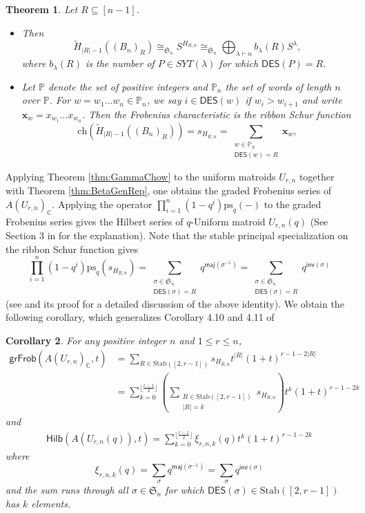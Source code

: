 \documentclass[reqno]{amsart}
\newcommand{\DES}{{\mathsf{DES}}}
\newcommand{\inv}{{\mathsf{inv}}}
\newcommand{\maj}{{\mathsf{maj}}}
\newcommand{\ch}{{\mathrm{ch}}}
\newcommand{\ps}{{\mathrm{ps}_q}}
\newcommand{\Stab}{{\mathrm{Stab}}}
\renewcommand{\S}{{\mathfrak{S}}}
\newcommand{\x}{{\mathbf{x}}}
\newcommand{\Hilb}{{\mathsf{Hilb}}}
\newcommand{\grFrob}{{\mathsf{grFrob}}}
\newtheorem{thm}{Theorem}[section]
\newtheorem{cor}[thm]{Corollary}
\theoremstyle{definition}
\theoremstyle{remark}
\begin{document}
\begin{thm} \label{thm:RankHomologyBn}
Let $R\subseteq [n-1]$. 
\begin{itemize}
    \item[(i)] Then
\[
    \tilde{H}_{|R|-1}({(B_n)}_R)\cong_{\S_n} S^{H_{R,n}}\cong_{\S_n}\bigoplus_{\lambda\vdash n}b_{\lambda}(R)S^{\lambda},
\]    
where $b_{\lambda}(R)$ is the number of $P\in SYT(\lambda)$ for which $\DES(P)=R$.
    \item[(ii)] Let $\mathbb{P}$ denote the set of positive integers and $\mathbb{P}_n$ the set of words of length $n$ over $\mathbb{P}$. For $w=w_1\ldots w_n\in\mathbb{P}_n$, we say $i\in\DES(w)$ if $w_i>w_{i+1}$ and write $\x_w=x_{w_1}\ldots x_{w_n}$. Then the Frobenius characteristic is the ribbon Schur function
\[
    \ch(\tilde{H}_{|R|-1}({(B_n)}_R))=s_{H_{R,n}}=\sum_{\substack{w\in\mathbb{P}_n\\ \DES(w)=R}}\mathbf{x}_w,
\]

\end{itemize}

\end{thm}

Applying Theorem \ref{thm:GammaChow} to the uniform matroids $U_{r,n}$ together with Theorem \ref{thm:BetaGenRep}, one obtains the graded Frobenius series of $A(U_{r,n})_{\mathbb{C}}$. Applying the operator  $\prod_{i=1}^n(1-q^i)\ps(-)$ to the graded Frobenius series gives the Hilbert series of $q$-Uniform matroid $U_{r,n}(q)$ (See Section 3 in \cite{Liao2023Two} for the explanation). Note that the stable principal specialization on the ribbon Schur function gives
\[
    \prod_{i=1}^n(1-q^i)\ps(s_{H_{R,n}})=\sum_{\substack{\sigma\in\S_n \\ \DES(\sigma)=R}}q^{\maj(\sigma^{-1})}=\sum_{\substack{\sigma\in\S_n \\ \DES(\sigma)=R}}q^{\inv(\sigma)}
\]
(see \cite[Thm. 4.4]{ShareshianWachs2020} and its proof for a detailed discussion of the above identity). We obtain the following corollary, which generalizes Corollary 4.10 and 4.11 of \cite{Liao2023Two}    

\begin{cor} \label{cor:ChowUniform}
For any positive integer $n$ and $1\le r\le n$,
\begin{align*}
    \grFrob(A(U_{r,n})_{\mathbb{C}},t)
    &=\sum_{R\in\Stab([2,r-1])}s_{H_{R,n}}t^{|R|}(1+t)^{r-1-2|R|}\\
    &=\sum_{k=0}^{\lfloor\frac{r-1}{2}\rfloor}\left(\sum_{\substack{R\in\Stab([2,r-1])\\ |R|=k}}s_{H_{R,n}}\right)t^k(1+t)^{r-1-2k}
\end{align*}
and 
\begin{align*}
    \Hilb(A(U_{r,n}(q)),t)
    =\sum_{k=0}^{\lfloor\frac{r-1}{2}\rfloor}\xi_{r,n,k}(q)t^k(1+t)^{r-1-2k}
\end{align*}
where 
\[
    \xi_{r,n,k}(q)=\sum_{\sigma}q^{\maj(\sigma^{-1})}=\sum_{\sigma}q^{\inv(\sigma)}
\]
and the sum runs through all $\sigma\in\S_n$ for which $\DES(\sigma)\in \Stab([2,r-1])$ has $k$ elements.
\end{cor}
\end{document}
